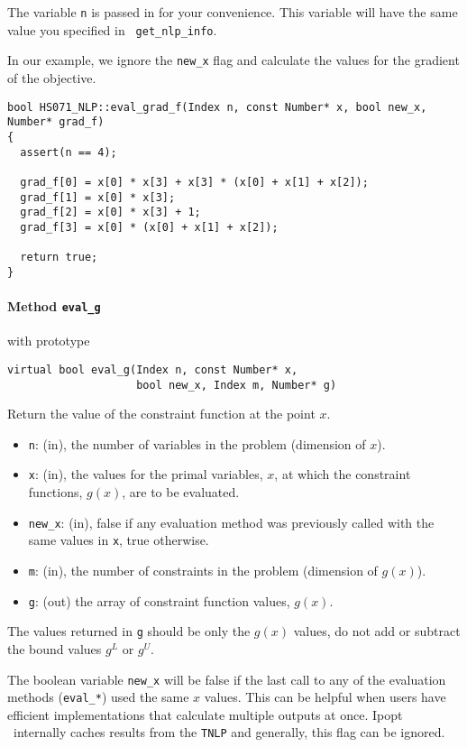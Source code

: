 \documentclass[10pt]{article}
\newcommand{\Ipopt}{{\sc Ipopt }}
\begin{document}
The variable {\tt n} is passed in for your convenience. This
variable will have the same value you specified in {\tt
get\_nlp\_info}.

In our example, we ignore the {\tt new\_x} flag and calculate the
values for the gradient of the objective.

\begin{footnotesize}
\begin{verbatim}
bool HS071_NLP::eval_grad_f(Index n, const Number* x, bool new_x, Number* grad_f)
{
  assert(n == 4);

  grad_f[0] = x[0] * x[3] + x[3] * (x[0] + x[1] + x[2]);
  grad_f[1] = x[0] * x[3];
  grad_f[2] = x[0] * x[3] + 1;
  grad_f[3] = x[0] * (x[0] + x[1] + x[2]);

  return true;
}
\end{verbatim}
\end{footnotesize}

\paragraph{Method {\texttt{eval\_g}}} with prototype
\begin{verbatim}
virtual bool eval_g(Index n, const Number* x, 
                    bool new_x, Index m, Number* g)
\end{verbatim}
Return the value of the constraint function at the point $x$.
\begin{itemize}
\item {\tt n}: (in), the number of variables in the problem (dimension of $x$). 
\item {\tt x}: (in), the values for the primal variables, $x$, at
  which the constraint functions,
  $g(x)$, are to be evaluated.
\item {\tt new\_x}: (in), false if any evaluation method was previously called 
        with the same values in {\tt x}, true otherwise.
\item {\tt m}: (in), the number of constraints in the problem (dimension of $g(x)$).
\item {\tt g}: (out) the array of constraint function values, $g(x)$.
\end{itemize}

The values returned in {\tt g} should be only the $g(x)$ values, 
do not add or subtract the bound values $g^L$ or $g^U$.

The boolean variable {\tt new\_x} will be false if the last call to
any of the evaluation methods ({\tt eval\_*}) used the same $x$
values. This can be helpful when users have efficient implementations
that calculate multiple outputs at once. \Ipopt\ internally caches
results from the {\tt TNLP} and generally, this flag can be ignored.
\end{document}
